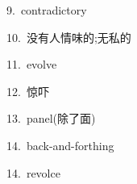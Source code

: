 \documentclass[a4paper, 12pt]{article}
\begin{document}
\begin{multicols}{2}
\begin{flushleft}
9.\ contradictory \ \ \ \ \underline{\hspace{3cm}}
\end{flushleft}

\begin{flushleft}
10.\ 没有人情味的;无私的 \ \ \ \ \underline{\hspace{3cm}}
\end{flushleft}
\end{multicols}

\begin{multicols}{2}
\begin{flushleft}
11.\ evolve \ \ \ \ \underline{\hspace{3cm}}
\end{flushleft}

\begin{flushleft}
12.\ 惊吓 \ \ \ \ \underline{\hspace{3cm}}
\end{flushleft}
\end{multicols}

\begin{multicols}{2}
\begin{flushleft}
13.\ panel(除了面) \ \ \ \ \underline{\hspace{3cm}}
\end{flushleft}

\begin{flushleft}
14.\ back-and-forthing \ \ \ \ \underline{\hspace{3cm}}
\end{flushleft}
\end{multicols}

\begin{multicols}{2}
\begin{flushleft}
14.\ revolce \ \ \ \ \underline{\hspace{3cm}}
\end{flushleft}
\end{multicols}
\end{document}
